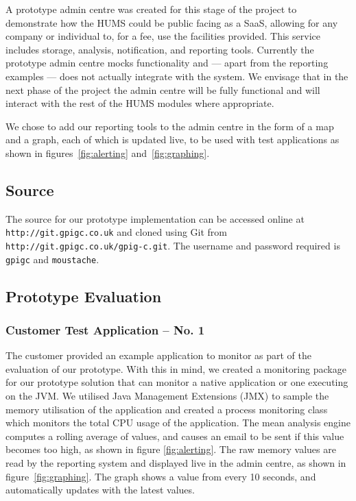 \documentclass[10pt,a4paper]{article}
\begin{document}
A prototype admin centre was created for this stage of the project to 
demonstrate how the HUMS could be public facing as a SaaS, allowing for any 
company or individual to, for a fee, use the facilities provided. This service includes
storage, analysis, notification, and reporting tools. Currently the prototype 
admin centre mocks functionality and --- apart from the reporting examples --- 
does not actually integrate with the system. We envisage that in the next phase 
of the project the admin centre will be fully functional and will interact with the rest of the HUMS modules where appropriate.

We chose to add our reporting tools to the admin centre in the form of a map
and a graph, each of which is updated live, to be used with test applications as shown in figures~\ref{fig:alerting} and~\ref{fig:graphing}.

\subsection{Source}
\label{sec:source}
The source for our prototype implementation can be accessed online at \texttt{http://git.gpigc.co.uk} and cloned using Git from \texttt{http://git.gpigc.co.uk/gpig-c.git}. The username and password required is \texttt{gpigc} and \texttt{moustache}.

\subsection{Prototype Evaluation}
\label{sec:prototype-evaluation}

\subsubsection{Customer Test Application -- No. 1}
The customer provided an example application to monitor as part of the
evaluation of our prototype. With this in mind, we created a monitoring 
package for our prototype solution that can monitor a native application
or one executing on the JVM. We utilised Java Management 
Extensions (JMX) to sample the memory utilisation of the application and
created a process monitoring class which monitors the total
CPU usage of the application. The mean analysis engine computes a 
rolling average of values, and causes an email to be sent if this value
becomes too high, as shown in figure \ref{fig:alerting}. The raw memory
values are read by the reporting system and displayed live in the admin
centre, as shown in figure~\ref{fig:graphing}. The graph shows a value from
every 10 seconds, and automatically updates with the latest values.
\end{document}
